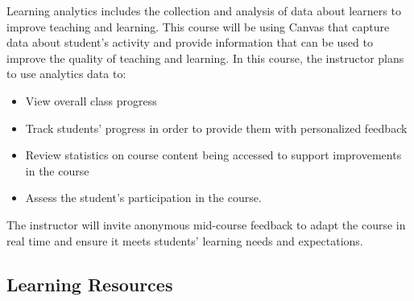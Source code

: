 \documentclass[
]{article}
\providecommand{\tightlist}{%
  \setlength{\itemsep}{0pt}\setlength{\parskip}{0pt}}
\begin{document}
Learning analytics includes the collection and analysis of data about
learners to improve teaching and learning. This course will be using
Canvas that capture data about student's activity and provide
information that can be used to improve the quality of teaching and
learning. In this course, the instructor plans to use analytics data to:

\begin{itemize}
\tightlist
\item
  View overall class progress
\item
  Track students' progress in order to provide them with personalized
  feedback
\item
  Review statistics on course content being accessed to support
  improvements in the course
\item
  Assess the student's participation in the course.
\end{itemize}

The instructor will invite anonymous mid-course feedback to adapt the
course in real time and ensure it meets students' learning needs and
expectations.

\subsection{Learning Resources}\label{learning-resources}
\end{document}

